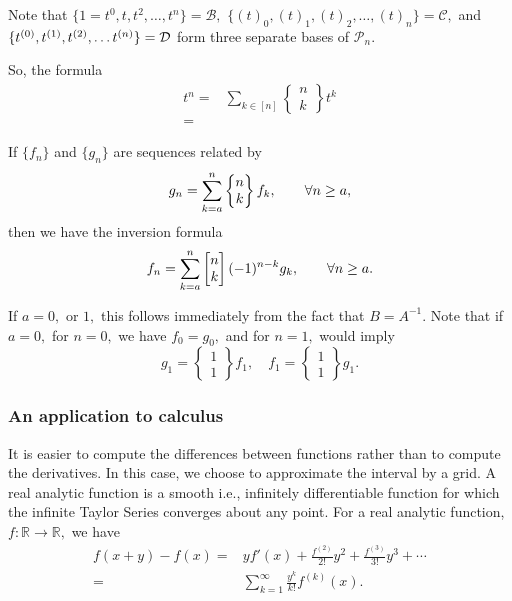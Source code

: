 
Note that $\{1 = t^0, t, t^2, \dotsc, t^n\} = \mathcal{B},$
$\{(t)_0, (t)_1, (t)_2, \dotsc, (t)_n \} = \mathcal{C},$ and
$\{t^{(0)}, t^{(1)}, t^{(2)}, \dotsc t^{(n)}\} \- = \mathcal{D}$
form three separate bases of $\mathcal{P}_n.$



So, the formula
\begin{align*}
	t^n ={}& \sum_{k \in [n]}^{} \begin{Bmatrix} n\\k \end{Bmatrix} t^k \\
	={}& 
\end{align*}


\begin{theorem}
	If $\{ f_n \}$ and $\{g_n\}$ are sequences related by
	$$ g_n = \sum_{k=a}^{n}  \begin{Bmatrix} n\\k \end{Bmatrix} f_k,
	\qquad \forall \/ n \geq a,$$
	then we have the inversion formula
	$$ f_n = \sum_{k=a}^{n} \begin{bmatrix} n \\k \end{bmatrix}
	(-1)^{n-k} g_k, \qquad \forall \/ n \geq a.$$
\end{theorem}

\begin{remark}
	If $a=0,$ or $1,$ this follows immediately from the fact that
	$B = A^{-1}.$ Note that if $a=0,$ for $n=0,$ we have $f_0 = g_0,$
	and for $n=1,$ would imply 
	$$g_1 = \begin{Bmatrix}1\\1\end{Bmatrix} f_1, \quad
	f_1 = \begin{Bmatrix}1\\1\end{Bmatrix} g_1.$$
\end{remark}

\subsubsection*{An application to calculus}
It is easier to compute the differences between functions rather than
to compute the derivatives. In this case, we choose to approximate the
interval by a grid. A real analytic function is a smooth i.e.,
infinitely differentiable function for which the infinite Taylor Series converges about any point. For a real analytic function, $f \colon \mathbb{R} \to \mathbb{R},$ we have
\begin{align*}
	f(x+y) - f(x) ={}& y f'(x) + \frac{f^{(2)}}{2!} y^2 + \frac{f^{(3)}}{3!} y^3 + 
	\cdots\\
	={}& \sum_{k=1}^{\infty} \frac{y^k}{k!} f^{(k)}(x).
\end{align*}

